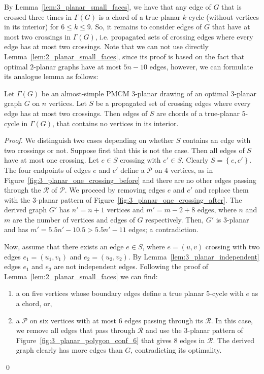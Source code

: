 By Lemma~\ref{lem:3_planar_small_faces}, we have that any edge of $G$ that is crossed three times in $\Gamma(G)$ is a chord of a true-planar $k$-cycle (without vertices in its interior) for $6\leq k\leq9$. So, it remains to consider edges of $G$ that have at most two crossings in $\Gamma(G)$, i.e. propagated sets of crossing edges where every edge has at most two crossings. Note that we can not use directly  Lemma~\ref{lem:2_planar_small_faces}, since its proof is based on the fact that optimal $2$-planar graphs have at most $5n-10$ edges, however, we can formulate its analogue lemma as follows:
\begin{lemma}
Let $\Gamma(G)$ be an almost-simple PMCM $3$-planar drawing of an optimal $3$-planar graph $G$ on $n$ vertices. Let $S$ be a propagated set of crossing edges where every edge has at most two crossings. Then edges of $S$ are chords of a true-planar $5$-cycle in $\Gamma(G)$, that contains no vertices in its interior. 
\label{lem:3_planar_small_faces_2}
\end{lemma}
\begin{proof}
We distinguish two cases depending on whether $S$ contains an edge with two crossings or not. Suppose first that this is not the case. Then all edges of $S$ have at most one crossing. Let $e\in S$ crossing with $e'\in S$. Clearly $S=\left\{e,e'\right\}$. The four endpoints of edges $e$ and $e'$ define a \pp $\mathcal{P}$ on $4$ vertices, as in Figure~\ref{fig:3_planar_one_crossing_before} and there are no other edges passing through the \pr $\mathcal{R}$ of $\mathcal{P}$. We proceed by removing edges $e$ and $e'$ and replace them with the $3$-planar pattern of Figure~\ref{fig:3_planar_one_crossing_after}. The derived graph $G'$ has $n'=n+1$ vertices and $m'=m-2+8$ edges, where $n$ and $m$ are the number of vertices and edges of $G$ respectively. Then, $G'$ is $3$-planar and has $m'=5.5n'-10.5>5.5n'-11$ edges; a contradiction.

Now, assume that there exists an edge $e\in S$, where $e=(u,v)$ crossing with two edges $e_1=(u_1,v_1)$ and $e_2=(u_2,v_2)$. By Lemma~\ref{lem:3_planar_independent} edges $e_1$ and $e_2$ are not independent edges. Following the proof of Lemma~\ref{lem:2_planar_small_faces} we can find:
\begin{enumerate}
\item  a \pp on five vertices whose boundary edges define a true planar $5$-cycle with $e$ as a chord, or,
\item a \pp $\mathcal{P}$ on six vertices with at most $6$ edges passing through its \pr  $\mathcal{R}$. In this case, we remove all edges that pass through $\mathcal{R}$ and use the $3$-planar pattern of Figure~\ref{fig:3_planar_polygon_conf_6} that gives $8$ edges in $\mathcal{R}$. The derived graph clearly has more edges than $G$, contradicting its optimality.
\end{enumerate}
\qed
\end{proof}

